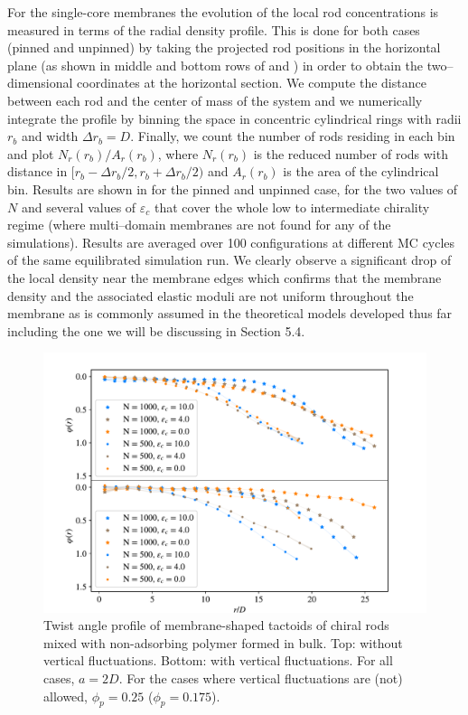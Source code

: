 For the single-core membranes the evolution of the local rod concentrations is measured in terms of  the radial density profile. This is done for both cases (pinned and unpinned) by taking the projected rod positions in the horizontal plane (as shown in middle and bottom rows of  and ) in order to obtain the two--dimensional coordinates at the horizontal section. We compute the distance between each rod and the center of mass of the system and we numerically integrate the profile by binning the space in concentric cylindrical rings with radii $r_b$ and width $\Delta r_b=D$. Finally, we count the number of rods residing in each bin and plot $N_r(r_b)/A_r(r_b)$, where $N_r(r_b)$ is the reduced number of rods with distance in $[r_b - \Delta r_b/2,r_b + \Delta r_b/2)$ and $A_r(r_b)$ is the area of the cylindrical bin.
Results are shown in  for the pinned and unpinned case, for the two values of $N$ and several values of $\varepsilon_c$ that cover the whole low to intermediate chirality regime (where multi--domain membranes are not found for any of the simulations). Results are averaged over 100 configurations at different MC cycles of the same equilibrated simulation run.
We clearly observe a significant drop of the local density near the membrane edges which confirms that the membrane density and the associated elastic moduli are not uniform throughout the membrane as is commonly assumed in the theoretical models developed thus far \cite{wensink2018elastic,kang_sm2016,kaplan2010theory} including the one we will be discussing in Section 5.4.


\begin{figure}
\includegraphics[width= .9\columnwidth]{figures/chapter-5/twistprofile}
	\caption[Twist angle profile]{Twist angle profile of membrane-shaped tactoids of chiral rods mixed with non-adsorbing polymer formed in bulk. Top: without vertical fluctuations. Bottom: with vertical fluctuations. For all cases, $a = 2D$. For the cases where vertical fluctuations are (not) allowed, $\phi_p=0.25$ ($\phi_p=0.175$). }
 \label{twangle}
\end{figure}




